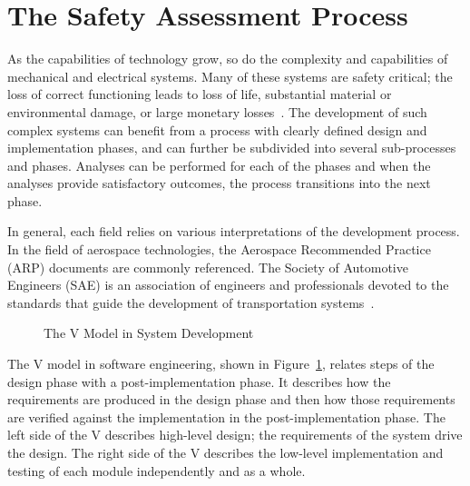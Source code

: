 \section{The Safety Assessment Process}
\label{sec:process}
As the capabilities of technology grow, so do the complexity and capabilities of mechanical and electrical systems. Many of these systems are safety critical; the loss of correct functioning leads to loss of life, substantial material or environmental damage, or large monetary losses~\cite{SAE}. The development of such complex systems can benefit from a process with clearly defined design and implementation phases, and can further be subdivided into several sub-processes and phases. Analyses can be performed for each of the phases and when the analyses provide satisfactory outcomes, the process transitions into the next phase. 

In general, each field relies on various interpretations of the development process. In the field of aerospace technologies, the Aerospace Recommended Practice (ARP) documents are commonly referenced. The Society of Automotive Engineers (SAE) is an association of engineers and professionals devoted to the standards that guide the development of transportation systems~\cite{SAE:ARP4761, SAE:ARP4754A}. 

\begin{figure}[!htb]
        \caption{\label{fig:v1} The V Model in System Development}
\end{figure}

The V model in software engineering, shown in Figure~\ref{fig:v1}, relates steps of the design phase with a post-implementation phase. It describes how the requirements are produced in the design phase and then how those requirements are verified against the implementation in the post-implementation phase. The left side of the V describes high-level design; the requirements of the system drive the design. The right side of the V describes the low-level implementation and testing of each module independently and as a whole. 

